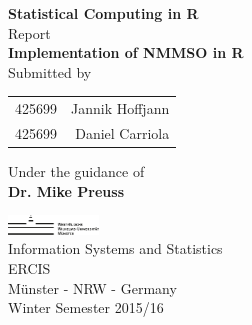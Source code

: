 \begin{titlepage}

\begin{center}

\textup{\small {\bf Statistical Computing in R} \\ Report}\\[0.2in]

\Large \textbf {Implementation of NMMSO in R}\\[0.5in]

\normalsize Submitted by \\
\begin{table}[h]
\centering
\begin{tabular}{lr}
425699 & Jannik Hoffjann \\
425699 & Daniel Carriola \\ 
\end{tabular}
\end{table}

\vspace{.1in}
Under the guidance of\\
{\textbf{Dr. Mike Preuss}}\\[0.2in]

\vfill

\includegraphics[width=0.18\textwidth]{./assets/wwu-logo}\\[0.1in]
\Large{Information Systems and Statistics}\\
\normalsize
\textsc{ERCIS}\\
Münster - NRW - Germany \\
\vspace{0.2cm}
Winter Semester 2015/16

\end{center}

\end{titlepage}
